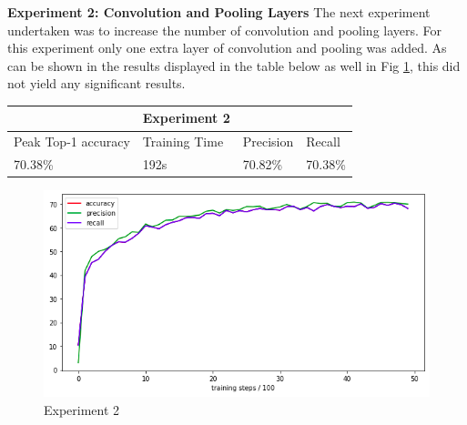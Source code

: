\documentclass[12pt]{report}
\begin{document}
\begin{flushleft}
\vspace{0.5cm}
\textbf{Experiment 2: Convolution and Pooling Layers}
\linebreak
The next experiment undertaken was to increase the number of convolution and pooling layers. For this experiment only one extra layer of convolution and pooling was added. As can be shown in the results displayed in the table below as well in Fig \ref{fig:experiment-2}, this did not yield any significant results.

\vspace{0.5cm}
\begin{tabular}{llll}
                                          & Experiment 2                       &                                &                              \\ \hline
\multicolumn{1}{|l|}{Peak Top-1 accuracy} & \multicolumn{1}{l|}{Training Time} & \multicolumn{1}{l|}{Precision} & \multicolumn{1}{l|}{Recall}  \\ \hline
\multicolumn{1}{|l|}{70.38\%}             & \multicolumn{1}{l|}{192s}          & \multicolumn{1}{l|}{70.82\%}   & \multicolumn{1}{l|}{70.38\%} \\ \hline
\end{tabular}

\vspace{0.5cm}
\begin{figure}[ht!]
	\centering
	\includegraphics[width=12cm]{experiment-2}
	\caption{Experiment 2}
	\label{fig:experiment-2}
\end{figure}
\end{flushleft}
\end{document}
